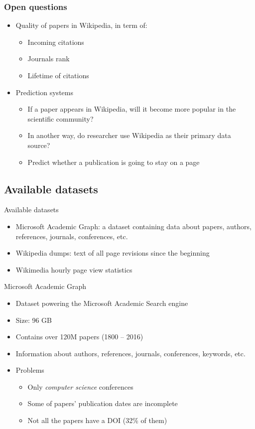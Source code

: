 \documentclass{beamer}
\begin{document}
\begin{frame}
\frametitle{Open questions}
\begin{itemize}
    \item Quality of papers in Wikipedia, in term of:
    \begin{itemize}
        \item Incoming citations
        \item Journals rank
        \item Lifetime of citations
    \end{itemize}
    \item Prediction systems
    \begin{itemize}
        \item If a paper appears in Wikipedia, will it become more popular in the scientific community?
        \item In another way, do researcher use Wikipedia as their primary data source?
        \item Predict whether a publication is going to stay on a page
    \end{itemize}
\end{itemize}
\end{frame}

\subsection{Available datasets}
\begin{frame}{Available datasets}
\begin{itemize}
    \item Microsoft Academic Graph: a dataset containing data about papers, authors, references, journals, conferences, etc.
    \item Wikipedia dumps: text of all page revisions since the beginning
    \item Wikimedia hourly page view statistics
\end{itemize}
\end{frame}

\begin{frame}{Microsoft Academic Graph}
    \begin{itemize}
        \item Dataset powering the Microsoft Academic Search engine
        \item Size: 96 GB
        \item Contains over 120M papers (1800 -- 2016)
        \item Information about authors, references, journals, conferences, keywords, etc.
        \item Problems
        \begin{itemize}
            \item Only \emph{computer science} conferences
            \item Some of papers' publication dates are incomplete
            \item Not all the papers have a DOI (32\% of them)
        \end{itemize}
    \end{itemize}
\end{frame}
\end{document}
